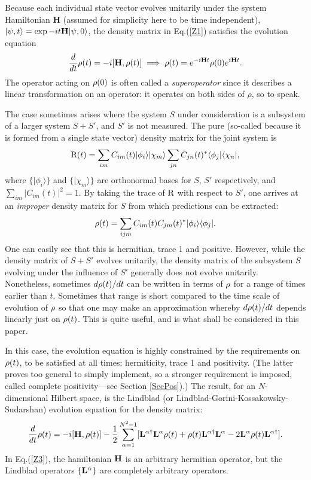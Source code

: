 \documentclass[aps,pra,amssymb, amsfonts,amsmath,showpacs, superscriptaddress,12pt]{revtex4}
\begin{document}
Because each individual state vector evolves unitarily under the system Hamiltonian {\bf H} (assumed for simplicity here to be time independent), $|\psi,t\rangle=\exp-i t{\bf H}|\psi,0\rangle$, the density matrix in Eq.(\ref{Z1}) satisfies the evolution equation 
\begin{equation}\label{Z2}
\frac{d}{dt}{\bf\rho}(t)=-i[{\bf H}, {\bf\rho}(t)]\implies{\bf\rho}(t)=e^{-i{\bf H}t}{\bf\rho}(0)e^{i{\bf H}t}.  
\end{equation}
\noindent  The operator acting on ${\bf\rho}(0)$ is often called a \textit{superoperator}\cite{Prig} since it describes a linear transformation on an operator:  it operates on both sides of $\rho$, so to speak.  

The case sometimes arises where the system $S$ under consideration is a subsystem of a larger system $S+S'$, and  $S'$  is not measured. The pure (so-called because it is formed from a single state vector) density matrix for the joint system is
\[
\hbox{{\cal R}} (t)=\sum_{im}C_{im}(t)|\phi_{i}\rangle|\chi_{m}\rangle
\sum_{jn}C_{jn}(t)^{*}\langle\phi_{j}|\langle\chi_{n}|,
\]
\noindent where $\{|\phi_{i}\rangle\}$ and $\{|\chi_{m}\rangle\}$ are orthonormal bases for $S$, $S'$ respectively, and $\sum_{im}|C_{im}(t)|^{2}=1$.
By taking the trace of $\hbox{{\cal R}}$ with respect to  $S'$, one arrives at an \textit{improper}\cite{dEspagnat} density matrix for $S$ from which predictions can be extracted:
\[
{\bf \rho} (t)=\sum_{ijm}C_{im}(t)C_{jm}(t)^{*}|\phi_{i}\rangle
\langle\phi_{j}|.
\]
One can easily see that this is hermitian, trace 1 and positive.  However, while the density matrix of $S+S'$ evolves unitarily, the density matrix of the subsystem $S$ evolving under the influence of  $S'$ generally does not evolve unitarily.  Nonetheless,  sometimes $d{\bf\rho}(t)/dt$ can be written in terms of ${\bf\rho}$ for a range of times earlier than $t$.  Sometimes that range is short compared to the time scale of evolution of  ${\bf\rho}$ so that one may make an approximation  whereby $d{\bf\rho}(t)/dt$ depends linearly just on ${\bf\rho}(t)$. This is quite useful, and is what shall be considered in this paper. 

In this case, the evolution equation is highly constrained by the requirements on ${\bf\rho}(t)$, to be satisfied at all times:  hermiticity, trace 1 and positivity. (The latter proves too general to simply implement, so a stronger requirement  is imposed, called complete positivity---see Section \ref{SecPos}).)  The result, for an $N$-dimensional Hilbert space, is the Lindblad\cite{Lind}  (or Lindblad-Gorini-Kossakowsky-Sudarshan\cite{Sud}) evolution equation for the density matrix:
\begin{equation}\label{Z3}
\frac{d}{dt}{\bf\rho}(t)=-i[{\bf H},{\bf\rho}(t)]
-\frac{1}{2}\sum_{\alpha=1}^{N^{2}-1}[{\bf L}^{\alpha\dagger}{\bf L}^{\alpha}{\bf\rho}(t)
+{\bf\rho}(t){\bf L}^{\alpha\dagger}{\bf L}^{\alpha}-2{\bf L}^{\alpha}{\bf\rho}(t){\bf L}^{\alpha\dagger}].
\end{equation}
In Eq.(\ref{Z3}), the hamiltonian ${\bf H}$ is an arbitrary hermitian operator, but the Lindblad operators $\{{\bf L}^{\alpha}\}$ are completely arbitrary operators.  
\end{document}
